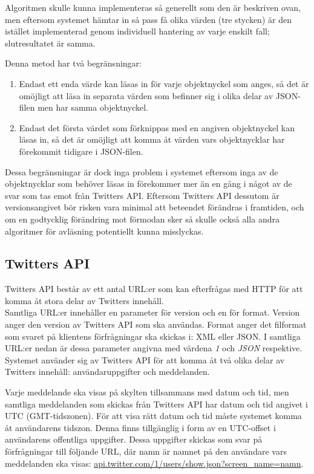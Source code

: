 \documentclass[a4paper,11pt]{article}
\begin{document}
Algoritmen skulle kunna implementeras så generellt som den är beskriven ovan, men eftersom systemet hämtar in så pass få olika värden (tre stycken) är den istället implementerad genom individuell hantering av varje enskilt fall; slutresultatet är samma.

Denna metod har två begränsningar:

	\begin{enumerate}
    	\item Endast ett enda värde kan läsas in för varje objektnyckel som anges, så det är omöjligt att läsa in separata värden som befinner sig i olika delar av JSON-filen men har samma objektnyckel.
    	\item Endast det första värdet som förknippas med en angiven objektnyckel kan läsas in, så det är omöjligt att komma åt värden vars objektnycklar har förekommit tidigare i JSON-filen.
	\end{enumerate}

Dessa begränsningar är dock inga problem i systemet eftersom inga av de objektnycklar som behöver läsas in förekommer mer än en gång i något av de svar som tas emot från Twitters API. Eftersom Twitters API dessutom är versionsangivet bör risken vara minimal att beteendet förändras i framtiden, och om en godtycklig förändring mot förmodan sker så skulle också alla andra algoritmer för avläsning potentiellt kunna misslyckas.

\subsection{Twitters API}
Twitters API består av ett antal URL:er som kan efterfrågas med HTTP för att komma åt stora delar av Twitters innehåll. \\

Samtliga URL:er innehåller en parameter för version och en för format. Version anger den version av Twitters API som ska användas. Format anger det filformat som svaret på klientens förfrågningar ska skickas i: XML eller JSON. I samtliga URL:er nedan är dessa parameter angivna med värdena {\it 1} och {\it JSON} respektive. \\

Systemet använder sig av Twitters API för att komma åt två olika delar av Twitters innehåll: användaruppgifter och meddelanden.

Varje meddelande ska visas på skylten tillsammans med datum och tid, men samtliga meddelanden som skickas från Twitters API har datum och tid angivet i UTC (GMT-tidszonen). För att visa rätt datum och tid måste systemet komma åt användarens tidszon. Denna finns tillgänglig i form av en UTC-offset i användarens offentliga uppgifter. Dessa uppgifter skickas som svar på förfrågningar till följande URL, där namn är namnet på den användare vars meddelanden ska visas: \url{api.twitter.com/1/users/show.json?screen_name=namn}. \\
\end{document}

